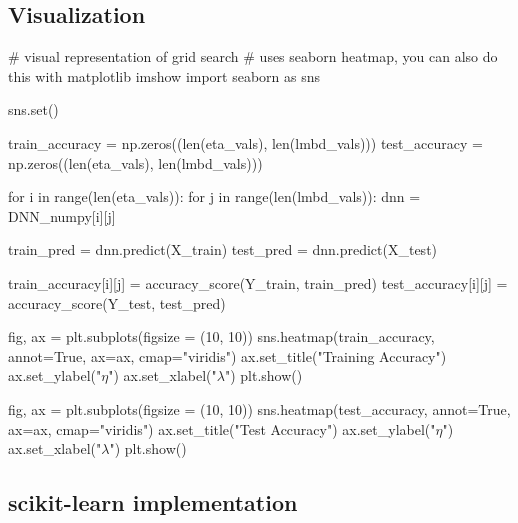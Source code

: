 \documentclass[%
oneside,                 %
final,                   %
10pt]{article}
\begin{document}
\epycod


\subsection{Visualization}



































\bpycod
# visual representation of grid search
# uses seaborn heatmap, you can also do this with matplotlib imshow
import seaborn as sns

sns.set()

train_accuracy = np.zeros((len(eta_vals), len(lmbd_vals)))
test_accuracy = np.zeros((len(eta_vals), len(lmbd_vals)))

for i in range(len(eta_vals)):
    for j in range(len(lmbd_vals)):
        dnn = DNN_numpy[i][j]
        
        train_pred = dnn.predict(X_train) 
        test_pred = dnn.predict(X_test)

        train_accuracy[i][j] = accuracy_score(Y_train, train_pred)
        test_accuracy[i][j] = accuracy_score(Y_test, test_pred)

        
fig, ax = plt.subplots(figsize = (10, 10))
sns.heatmap(train_accuracy, annot=True, ax=ax, cmap="viridis")
ax.set_title("Training Accuracy")
ax.set_ylabel("$\eta$")
ax.set_xlabel("$\lambda$")
plt.show()

fig, ax = plt.subplots(figsize = (10, 10))
sns.heatmap(test_accuracy, annot=True, ax=ax, cmap="viridis")
ax.set_title("Test Accuracy")
ax.set_ylabel("$\eta$")
ax.set_xlabel("$\lambda$")
plt.show()

\epycod


\subsection{scikit-learn implementation}
\end{document}
